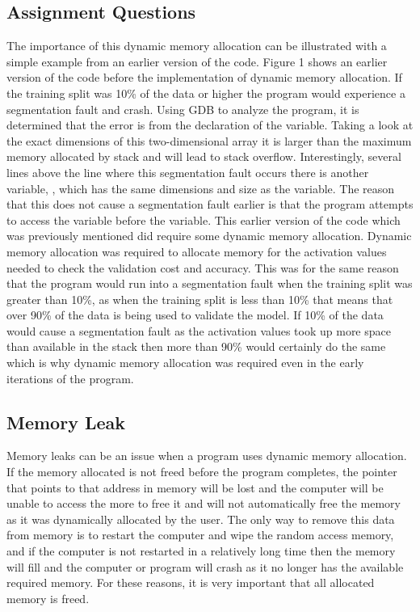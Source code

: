 \documentclass[12pt]{article}
\begin{document}
\subsection{Assignment Questions}

The importance of this dynamic memory allocation can be illustrated with a simple example from an earlier version of the code. Figure 1 shows an earlier version of the code before the implementation of dynamic memory allocation. If the training split was 10\% of the data or higher the program would experience a segmentation fault and crash. Using GDB to analyze the program, it is determined that the error is from the declaration of the  variable. Taking a look at the exact dimensions of this two-dimensional array it is larger than the maximum memory allocated by stack and will lead to stack overflow. Interestingly, several lines above the line where this segmentation fault occurs there is another variable, , which has the same dimensions and size as the  variable. The reason that this does not cause a segmentation fault earlier is that the program attempts to access the  variable before the  variable.
This earlier version of the code which was previously mentioned did require some dynamic memory allocation. Dynamic memory allocation was required to allocate memory for the activation values needed to check the validation cost and accuracy. This was for the same reason that the program would run into a segmentation fault when the training split was greater than 10\%, as when the training split is less than 10\% that means that over 90\% of the data is being used to validate the model. If 10\% of the data would cause a segmentation fault as the activation values took up more space than available in the stack then more than 90\% would certainly do the same which is why dynamic memory allocation was required even in the early iterations of the program.


\subsection{Memory Leak}

Memory leaks can be an issue when a program uses dynamic memory allocation. If the memory allocated is not freed before the program completes, the pointer that points to that address in memory will be lost and the computer will be unable to access the more to free it and will not automatically free the memory as it was dynamically allocated by the user. The only way to remove this data from memory is to restart the computer and wipe the random access memory, and if the computer is not restarted in a relatively long time then the memory will fill and the computer or program will crash as it no longer has the available required memory. For these reasons, it is very important that all allocated memory is freed.
\end{document}

